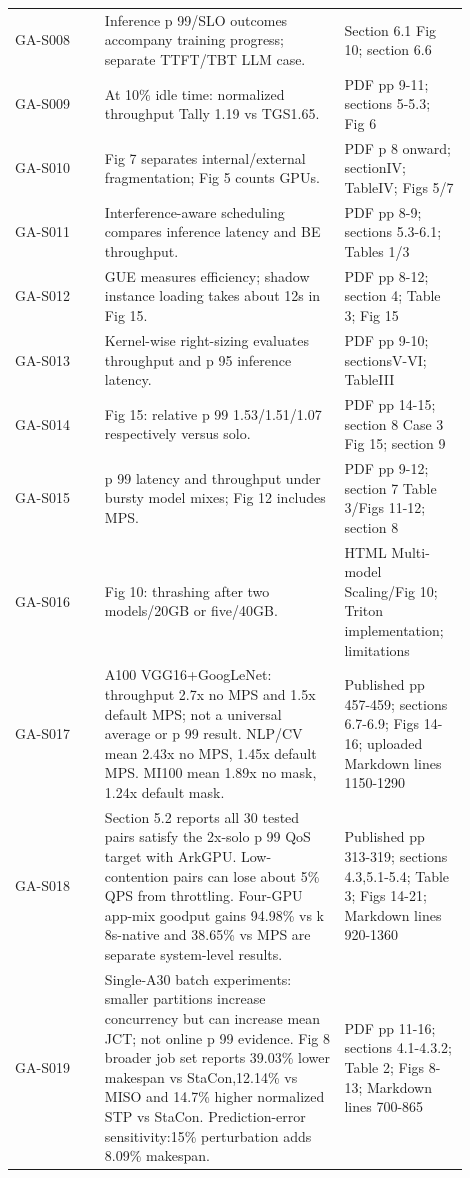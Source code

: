 \documentclass[12pt,a 4paper]{article}
\begin{document}
\begin{longtable}{P{0.18\linewidth}P{0.48\linewidth}P{0.24\linewidth}}
GA-S008 \cite{sirius} & Inference p 99/SLO outcomes accompany training progress; separate TTFT/TBT LLM case. & Section 6.1 Fig 10; section 6.6\\
GA-S009 \cite{tally} & At 10\% idle time: normalized throughput Tally 1.19 vs TGS1.65. & PDF pp 9-11; sections 5-5.3; Fig 6\\
GA-S010 \cite{parva} & Fig 7 separates internal/external fragmentation; Fig 5 counts GPUs. & PDF p 8 onward; sectionIV; TableIV; Figs 5/7\\
GA-S011 \cite{orion} & Interference-aware scheduling compares inference latency and BE throughput. & PDF pp 8-9; sections 5.3-6.1; Tables 1/3\\
GA-S012 \cite{gslice} & GUE measures efficiency; shadow instance loading takes about 12s in Fig 15. & PDF pp 8-12; section 4; Table 3; Fig 15\\
GA-S013 \cite{krisp} & Kernel-wise right-sizing evaluates throughput and p 95 inference latency. & PDF pp 9-10; sectionsV-VI; TableIII\\
GA-S014 \cite{xsched} & Fig 15: relative p 99 1.53/1.51/1.07 respectively versus solo. & PDF pp 14-15; section 8 Case 3 Fig 15; section 9\\
GA-S015 \cite{paella} & p 99 latency and throughput under bursty model mixes; Fig 12 includes MPS. & PDF pp 9-12; section 7 Table 3/Figs 11-12; section 8\\
GA-S016 \cite{gnntriton} & Fig 10: thrashing after two models/20GB or five/40GB. & HTML Multi-model Scaling/Fig 10; Triton implementation; limitations\\
GA-S017 \cite{vastpipe} & A100 VGG16+GoogLeNet: throughput 2.7x no MPS and 1.5x default MPS; not a universal average or p 99 result. NLP/CV mean 2.43x no MPS, 1.45x default MPS. MI100 mean 1.89x no mask, 1.24x default mask. & Published pp 457-459; sections 6.7-6.9; Figs 14-16; uploaded Markdown lines 1150-1290\\
GA-S018 \cite{arkgpu} & Section 5.2 reports all 30 tested pairs satisfy the 2x-solo p 99 QoS target with ArkGPU. Low-contention pairs can lose about 5\% QPS from throttling. Four-GPU app-mix goodput gains 94.98\% vs k 8s-native and 38.65\% vs MPS are separate system-level results. & Published pp 313-319; sections 4.3,5.1-5.4; Table 3; Figs 14-21; Markdown lines 920-1360\\
GA-S019 \cite{dynap} & Single-A30 batch experiments: smaller partitions increase concurrency but can increase mean JCT; not online p 99 evidence. Fig 8 broader job set reports 39.03\% lower makespan vs StaCon,12.14\% vs MISO and 14.7\% higher normalized STP vs StaCon. Prediction-error sensitivity:15\% perturbation adds 8.09\% makespan. & PDF pp 11-16; sections 4.1-4.3.2; Table 2; Figs 8-13; Markdown lines 700-865\\

\end{longtable}
\end{document}
